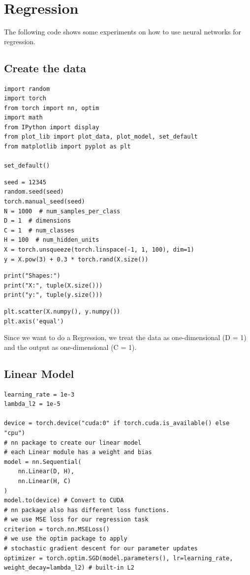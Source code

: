 \chapter{Regression}
    
    
    
    
    
        
    The following code shows some experiments on how to use neural networks for regression.
    \section{Create the data}
    \begin{verbatim}
import random
import torch
from torch import nn, optim
import math
from IPython import display
from plot_lib import plot_data, plot_model, set_default
from matplotlib import pyplot as plt

set_default()        
        \end{verbatim}
        
        \begin{verbatim}
seed = 12345
random.seed(seed)
torch.manual_seed(seed)
N = 1000  # num_samples_per_class
D = 1  # dimensions
C = 1  # num_classes
H = 100  # num_hidden_units
X = torch.unsqueeze(torch.linspace(-1, 1, 100), dim=1)
y = X.pow(3) + 0.3 * torch.rand(X.size())
        \end{verbatim}
        
        \begin{verbatim}
print("Shapes:")
print("X:", tuple(X.size()))
print("y:", tuple(y.size()))
        \end{verbatim}
        
        \begin{verbatim}
plt.scatter(X.numpy(), y.numpy())
plt.axis('equal')        
        \end{verbatim}
        Since we want to do a Regression, we treat the data as one-dimensional (D = 1) and the output as one-dimensional (C = 1).
        
        \section{Linear Model}
        \begin{verbatim}
learning_rate = 1e-3
lambda_l2 = 1e-5

device = torch.device("cuda:0" if torch.cuda.is_available() else "cpu")
# nn package to create our linear model
# each Linear module has a weight and bias
model = nn.Sequential(
    nn.Linear(D, H),
    nn.Linear(H, C)
)
model.to(device) # Convert to CUDA
# nn package also has different loss functions.
# we use MSE loss for our regression task
criterion = torch.nn.MSELoss()
# we use the optim package to apply
# stochastic gradient descent for our parameter updates
optimizer = torch.optim.SGD(model.parameters(), lr=learning_rate, weight_decay=lambda_l2) # built-in L2
        \end{verbatim}
        

